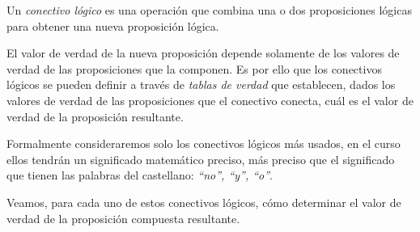 \medskip


\begin{defn}
	Un {\em conectivo l\'ogico} es una {operaci\'on} que combina 
	una o dos proposiciones lógicas para obtener 
	una nueva proposición lógica. 
	
	El valor de verdad
	de la nueva proposici\'on depende solamente de los valores
	de verdad de las proposiciones que la componen. 
	Es por ello que los conectivos lógicos se pueden definir a trav\'es de
	{\em tablas de verdad} que establecen, dados
	los valores de verdad de las proposiciones que el conectivo
	conecta, cu\'al es el valor de verdad de la proposici\'on resultante.
\end{defn}

Formalmente consideraremos solo los conectivos l\'ogicos más usados, 
en el curso ellos tendr\'an un significado matem\'atico preciso, 
m\'as preciso que el significado que tienen las palabras del castellano: 
{\em ``no'', ``y'',  ``o''}.

Veamos, para cada uno de estos conectivos l\'ogicos, c\'omo
determinar el valor de verdad de la proposici\'on compuesta resultante. 

